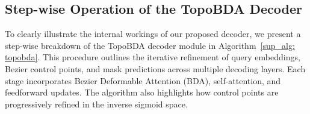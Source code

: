 
\subsection{Step-wise Operation of the TopoBDA Decoder}
\label{sup_sec: algorithm_topobda_decoder}

To clearly illustrate the internal workings of our proposed decoder, we present a step-wise breakdown of the TopoBDA decoder module in Algorithm~\ref{sup_alg: topobda}. This procedure outlines the iterative refinement of query embeddings, Bezier control points, and mask predictions across multiple decoding layers. Each stage incorporates Bezier Deformable Attention (BDA), self-attention, and feedforward updates. The algorithm also highlights how control points are progressively refined in the inverse sigmoid space.

